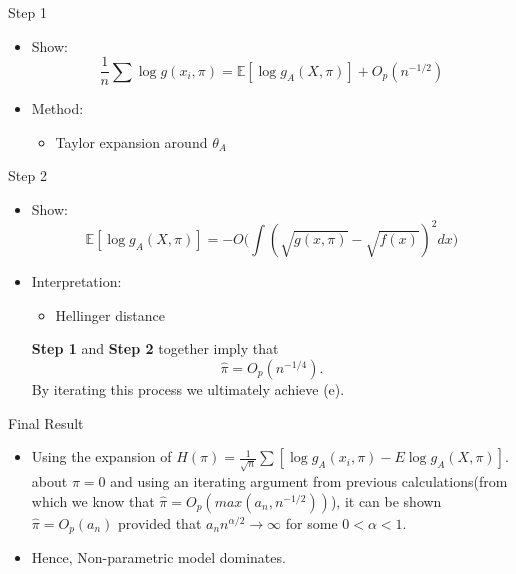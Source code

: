 \begin{frame}{Step 1}
\begin{itemize}
    \item Show:
    \[
    \frac{1}{n}\sum \log g(x_i,\pi)
    =
    \mathbb{E}[\log g_A(X,\pi)] + O_p(n^{-1/2})
    \]

    \item Method:
    \begin{itemize}
        \item Taylor expansion around $\theta_A$
    \end{itemize}
\end{itemize}
\end{frame}


\begin{frame}{Step 2}
\begin{itemize}
    \item Show:
    \[
    \mathbb{E}[\log g_A(X,\pi)]
    =
    -O\Big(\int (\sqrt{g(x,\pi)}-\sqrt{f(x)})^2 dx\Big)
    \]

    \item Interpretation:
    \begin{itemize}
        \item Hellinger distance
    \end{itemize}

\textbf{Step 1} and \textbf{Step 2} together imply that 
\[
\hat{\pi} = O_p(n^{-1/4}).
\]
By iterating this process we ultimately achieve (e).

\end{itemize}
\end{frame}


\begin{frame}{Final Result}
\begin{itemize}
    \item Using the expansion of $
H(\pi) = \frac{1}{\sqrt{n}} \sum \left[ \log g_A(x_i,\pi) - E \log g_A(X,\pi) \right].
$ about $\pi = 0$ and using an iterating argument from previous calculations(from which we know that $\hat\pi = O_p(max(a_n,n^{-1/2}))$), it can be shown $\hat\pi = O_p(a_n)$ provided that $a_n n^{\alpha/2} \to \infty $ for some $0<\alpha<1$.

    \item Hence, Non-parametric model dominates.
    
\end{itemize}
\end{frame}
